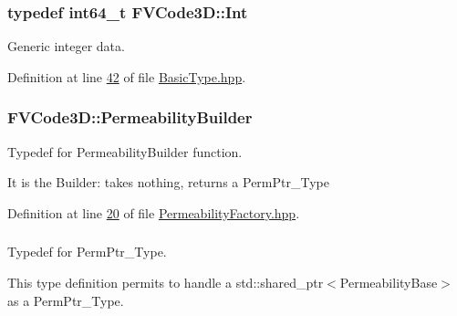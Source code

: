 \subsubsection[{\texorpdfstring{Int}{Int}}]{\setlength{\rightskip}{0pt plus 5cm}typedef int64\+\_\+t {\bf F\+V\+Code3\+D\+::\+Int}}\hypertarget{namespaceFVCode3D_a2263c42382b217732a2d4e1f7348120a}{}\label{namespaceFVCode3D_a2263c42382b217732a2d4e1f7348120a}


Generic integer data. 



Definition at line \hyperlink{BasicType_8hpp_source_l00042}{42} of file \hyperlink{BasicType_8hpp_source}{Basic\+Type.\+hpp}.

\subsubsection[{\texorpdfstring{Permeability\+Builder}{PermeabilityBuilder}}]{\setlength{\rightskip}{0pt plus 5cm}F\+V\+Code3\+D\+::\+Permeability\+Builder}\hypertarget{namespaceFVCode3D_ad92e05ac4c0491bab1c45e5457d2518c}{}\label{namespaceFVCode3D_ad92e05ac4c0491bab1c45e5457d2518c}


Typedef for Permeability\+Builder function. 

It is the Builder\+: takes nothing, returns a Perm\+Ptr\+\_\+\+Type 

Definition at line \hyperlink{PermeabilityFactory_8hpp_source_l00020}{20} of file \hyperlink{PermeabilityFactory_8hpp_source}{Permeability\+Factory.\+hpp}.

\subsubsection[{\texorpdfstring{Perm\+Ptr\+\_\+\+Type}{PermPtr_Type}}]{}\hypertarget{namespaceFVCode3D_aee5ae48a57366603109f90f526a645b1}{}\label{namespaceFVCode3D_aee5ae48a57366603109f90f526a645b1}


Typedef for Perm\+Ptr\+\_\+\+Type. 

This type definition permits to handle a std\+::shared\+\_\+ptr$<$\+Permeability\+Base$>$ as a Perm\+Ptr\+\_\+\+Type. 


